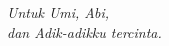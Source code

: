 \acknowledgment
\vspace*{\fill}
 \begin{flushright}
 \emph{Untuk Umi, Abi,\\dan Adik-adikku tercinta.}
 \end{flushright}